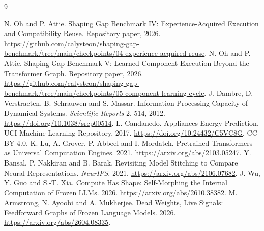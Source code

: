\documentclass[11pt]{article}
\begin{document}
\begin{thebibliography}{9}\footnotesize\setlength{\itemsep}{0pt}\raggedright
{} N. Oh and P. Attie. Shaping Gap Benchmark IV: Experience-Acquired Execution and Compatibility Reuse. Repository paper, 2026. \url{https://github.com/calysteon/shaping-gap-benchmark/tree/main/checkpoints/04-experience-acquired-reuse}.
 N. Oh and P. Attie. Shaping Gap Benchmark V: Learned Component Execution Beyond the Transformer Graph. Repository paper, 2026. \url{https://github.com/calysteon/shaping-gap-benchmark/tree/main/checkpoints/05-component-learning-cycle}.
 J. Dambre, D. Verstraeten, B. Schrauwen and S. Massar. Information Processing Capacity of Dynamical Systems. \emph{Scientific Reports} 2, 514, 2012. \url{https://doi.org/10.1038/srep00514}.
 L. Candanedo. Appliances Energy Prediction. UCI Machine Learning Repository, 2017. \url{https://doi.org/10.24432/C5VC8G}. CC BY 4.0.
 K. Lu, A. Grover, P. Abbeel and I. Mordatch. Pretrained Transformers as Universal Computation Engines. 2021. \url{https://arxiv.org/abs/2103.05247}.
 Y. Bansal, P. Nakkiran and B. Barak. Revisiting Model Stitching to Compare Neural Representations. \emph{NeurIPS}, 2021. \url{https://arxiv.org/abs/2106.07682}.
 J. Wu, Y. Guo and S.-T. Xia. Compute Has Shape: Self-Morphing the Internal Computation of Frozen LLMs. 2026. \url{https://arxiv.org/abs/2610.38382}.
 M. Armstrong, N. Ayoobi and A. Mukherjee. Dead Weights, Live Signals: Feedforward Graphs of Frozen Language Models. 2026. \url{https://arxiv.org/abs/2604.08335}.
\end{thebibliography}
\end{document}
